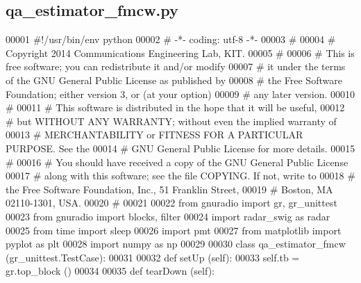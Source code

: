 \subsection{qa\+\_\+estimator\+\_\+fmcw.\+py}
\label{qa__estimator__fmcw_8py_source}

\begin{DoxyCode}
00001 \textcolor{comment}{#!/usr/bin/env python}
00002 \textcolor{comment}{# -*- coding: utf-8 -*-}
00003 \textcolor{comment}{# }
00004 \textcolor{comment}{# Copyright 2014 Communications Engineering Lab, KIT.}
00005 \textcolor{comment}{# }
00006 \textcolor{comment}{# This is free software; you can redistribute it and/or modify}
00007 \textcolor{comment}{# it under the terms of the GNU General Public License as published by}
00008 \textcolor{comment}{# the Free Software Foundation; either version 3, or (at your option)}
00009 \textcolor{comment}{# any later version.}
00010 \textcolor{comment}{# }
00011 \textcolor{comment}{# This software is distributed in the hope that it will be useful,}
00012 \textcolor{comment}{# but WITHOUT ANY WARRANTY; without even the implied warranty of}
00013 \textcolor{comment}{# MERCHANTABILITY or FITNESS FOR A PARTICULAR PURPOSE.  See the}
00014 \textcolor{comment}{# GNU General Public License for more details.}
00015 \textcolor{comment}{# }
00016 \textcolor{comment}{# You should have received a copy of the GNU General Public License}
00017 \textcolor{comment}{# along with this software; see the file COPYING.  If not, write to}
00018 \textcolor{comment}{# the Free Software Foundation, Inc., 51 Franklin Street,}
00019 \textcolor{comment}{# Boston, MA 02110-1301, USA.}
00020 \textcolor{comment}{# }
00021 
00022 \textcolor{keyword}{from} gnuradio \textcolor{keyword}{import} gr, gr\_unittest
00023 \textcolor{keyword}{from} gnuradio \textcolor{keyword}{import} blocks, filter
00024 \textcolor{keyword}{import} radar\_swig \textcolor{keyword}{as} radar
00025 \textcolor{keyword}{from} time \textcolor{keyword}{import} sleep
00026 \textcolor{keyword}{import} pmt
00027 \textcolor{keyword}{from} matplotlib \textcolor{keyword}{import} pyplot \textcolor{keyword}{as} plt
00028 \textcolor{keyword}{import} numpy \textcolor{keyword}{as} np
00029 
00030 \textcolor{keyword}{class }qa_estimator_fmcw (gr\_unittest.TestCase):
00031 
00032     \textcolor{keyword}{def }setUp (self):
00033         self.tb = gr.top\_block ()
00034 
00035     \textcolor{keyword}{def }tearDown (self):

\end{DoxyCode}
